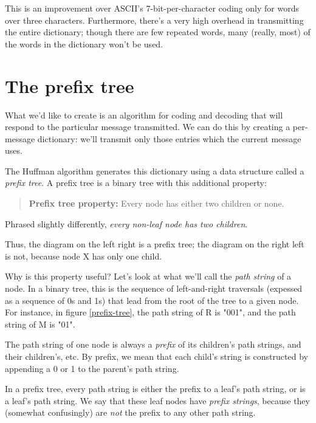 This is an improvement over ASCII's 7-bit-per-character coding only for words over three characters. Furthermore, there's a very high overhead in transmitting the entire dictionary; though there are few repeated words, many (really, most) of the words in the dictionary won't be used. 

\section{The prefix tree}

What we'd like to create is an algorithm for coding and decoding that will respond to the particular message transmitted. We can do this by creating a per-message dictionary: we'll transmit only those entries which the current message uses.

The Huffman algorithm generates this dictionary using a data structure called a \textit{prefix tree}. A prefix tree is a binary tree with this additional property:
\begin{quotation}
\textbf{Prefix tree property:} Every node has either two children or none.
\end{quotation}
Phrased slightly differently, {\em every non-leaf node has two children}.

\begin{figure}[prefix-tree]
\end{figure}
\begin{figure}[not-a-prefix-tree]
\end{figure}
Thus, the diagram on the {left right} is a prefix tree; the diagram on the {right left} is not, because node X has only one child.

Why is this property useful? Let's look at what we'll call the \textit{path string} of a node. In a binary tree, this is the sequence of left-and-right traversals (expessed as a sequence of 0s and 1s) that lead from the root of the tree to a given node. For instance, in figure \ref{prefix-tree}, the path string of R is "001", and the path string of M is "01".

The path string of one node is always a \textit{prefix} of its children's path strings, and their children's, etc. By prefix, we mean that each child's string is constructed by appending a 0 or 1 to the parent's path string.

In a prefix tree, every path string is either the prefix to a leaf's path string, or is a leaf's path string. We say that these leaf nodes have \textit{prefix strings}, because they (somewhat confusingly) are \textit{not} the prefix to any other path string.

